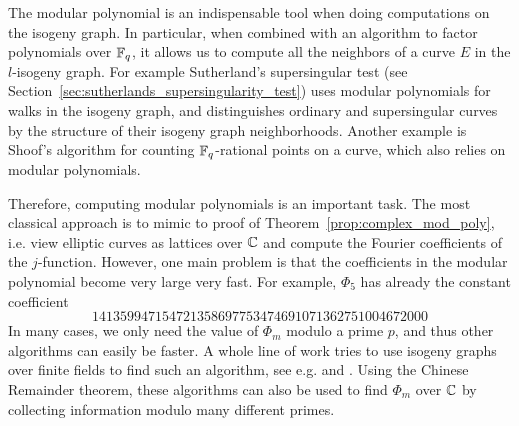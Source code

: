 The modular polynomial is an indispensable tool when doing computations on the isogeny graph.
In particular, when combined with an algorithm to factor polynomials over $\mathbb{F}_q$, it allows us to compute all the neighbors of a curve $E$ in the $l$-isogeny graph.
For example Sutherland's supersingular test (see Section~\ref{sec:sutherlands_supersingularity_test}) uses modular polynomials for walks in the isogeny graph, and distinguishes ordinary and supersingular curves by the structure of their isogeny graph neighborhoods.
Another example is Shoof's algorithm \cite{shoof_point_counting} for counting $\mathbb{F}_q$-rational points on a curve, which also relies on modular polynomials.

Therefore, computing modular polynomials is an important task.
The most classical approach is to mimic to proof of Theorem~\ref{prop:complex_mod_poly}, i.e. view elliptic curves as lattices over $\mathbb{C}$ and compute the Fourier coefficients of the $j$-function.
However, one main problem is that the coefficients in the modular polynomial become very large very fast.
For example, $\Phi_5$ has already the constant coefficient
\begin{equation*}
    141359947154721358697753474691071362751004672000
\end{equation*}
In many cases, we only need the value of $\Phi_m$ modulo a prime $p$, and thus other algorithms can easily be faster.
A whole line of work tries to use isogeny graphs over finite fields to find such an algorithm, see e.g. \cite{compute_modular_polynomial} and \cite{compute_modular_polynomial2}.
Using the Chinese Remainder theorem, these algorithms can also be used to find $\Phi_m$ over $\mathbb{C}$ by collecting information modulo many different primes.
